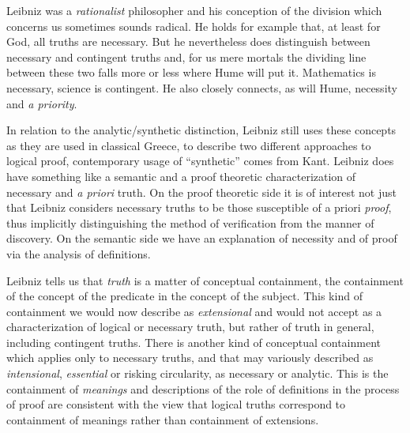 Leibniz was a \emph{rationalist} philosopher and his conception of the division which concerns us sometimes sounds radical.
He holds for example that, at least for God, all truths are necessary.
But he nevertheless does distinguish between necessary and contingent truths and, for us mere mortals the dividing line between these two falls more or less where Hume will put it.
Mathematics is necessary, science is contingent.
He also closely connects, as will Hume, necessity and \emph{a priority}.

In relation to the analytic/\-synthetic distinction, Leibniz still uses these concepts as they are used in classical Greece, to describe two different approaches to logical proof, contemporary usage of ``synthetic'' comes from Kant.
Leibniz does have something like a semantic and a proof theoretic characterization of necessary and \emph{a priori} truth.
On the proof theoretic side it is of interest not just that Leibniz considers necessary truths to be those susceptible of a priori \emph{proof}, thus implicitly distinguishing the method of verification from the manner of discovery. 
On the semantic side we have an explanation of necessity and of proof via the analysis of definitions.

Leibniz tells us that \emph{truth} is a matter of conceptual containment, the containment of the concept of the predicate in the concept of the subject.
This kind of containment we would now describe as \emph{extensional} and would not accept as a characterization of logical or necessary truth, but rather of truth in general, including contingent truths.
There is another kind of conceptual containment which applies only to necessary truths, and that may variously described as \emph{intensional}, \emph{essential} or risking circularity, as necessary or analytic.
This is the containment of \emph{meanings} and descriptions of the role of definitions in the process of proof are consistent with the view that logical truths correspond to containment of meanings rather than containment of extensions.

